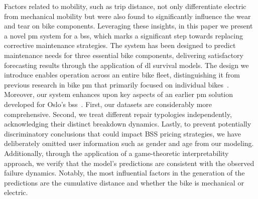 Factors related to mobility, such as trip distance, not only differentiate electric from mechanical mobility but were also found to significantly influence the wear and tear on bike components. Leveraging these insights, in this paper we present a novel \ac{pm} system for a \ac{bss}, which marks a significant step towards replacing corrective maintenance strategies. The system has been designed to predict maintenance needs for three essential bike components, delivering satisfactory forecasting results through the application of \ac{dl} survival models. The design we introduce enables operation across an entire bike fleet, distinguishing it from previous research in bike \ac{pm} that primarily focused on individual bikes~\cite{MountainBike2019, Matkovic2021}. Moreover, our system enhances upon key aspects of an earlier \ac{pm} solution developed for Oslo's \ac{bss}~\cite{Predictivemaintenancebike2018}. First, our datasets are considerably more comprehensive. Second, we treat different repair typologies independently, acknowledging their distinct breakdown dynamics.  Lastly, to prevent potentially discriminatory conclusions that could impact BSS pricing strategies, we have deliberately omitted user information such as gender and age from our modeling. Additionally, through the application of a game-theoretic interpretability approach, we verify that the model's predictions are consistent with the observed failure dynamics. Notably, the most influential factors in the generation of the predictions are the cumulative distance and whether the bike is mechanical or electric.

